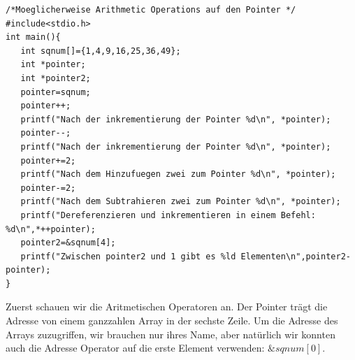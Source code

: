 \documentclass{article}[12pt]
\begin{document}
\begin{lstlisting}
/*Moeglicherweise Arithmetic Operations auf den Pointer */
#include<stdio.h>
int main(){
   int sqnum[]={1,4,9,16,25,36,49};
   int *pointer;
   int *pointer2;
   pointer=sqnum;
   pointer++;
   printf("Nach der inkrementierung der Pointer %d\n", *pointer);
   pointer--;
   printf("Nach der inkrementierung der Pointer %d\n", *pointer);
   pointer+=2;
   printf("Nach dem Hinzufuegen zwei zum Pointer %d\n", *pointer);
   pointer-=2;
   printf("Nach dem Subtrahieren zwei zum Pointer %d\n", *pointer);   
   printf("Dereferenzieren und inkrementieren in einem Befehl: %d\n",*++pointer);
   pointer2=&sqnum[4];
   printf("Zwischen pointer2 und 1 gibt es %ld Elementen\n",pointer2-pointer);
}
\end{lstlisting}
Zuerst schauen wir die Aritmetischen Operatoren an. Der Pointer trägt die Adresse von einem 
ganzzahlen Array in der sechste Zeile. Um die Adresse des Arrays zuzugriffen, wir brauchen nur ihres Name, aber 
natürlich wir konnten auch die Adresse Operator auf die erste Element verwenden: $\&sqnum[0]$.
\end{document}
